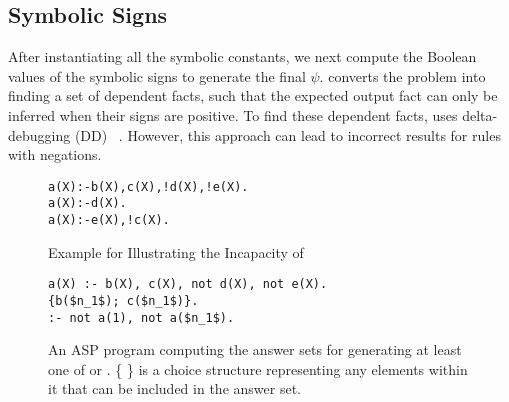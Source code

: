 \subsection{Symbolic Signs}

After instantiating all the symbolic constants, 
we next compute the Boolean values of the symbolic signs to generate the final $\psi$. 
\Symlog converts the problem 
into finding a set of dependent facts, such that the expected output fact can only be inferred when their signs are positive.
To find these dependent facts, \Symlog uses delta-debugging (DD) ~\cite{zeller1999yesterday}. 
However, this approach can lead to incorrect results for rules with negations.


\begin{figure}[!b]
\vspace{-4mm}
\begin{lstlisting}[xleftmargin=7em,numbers=none,basicstyle=\footnotesize\ttfamily]
a(X):-b(X),c(X),!d(X),!e(X).
a(X):-d(X).
a(X):-e(X),!c(X).
\end{lstlisting} 
\caption{Example for Illustrating the Incapacity of \Symlog}
\label{fig:symbolic_sign_Example}
\vspace{-1mm}
\end{figure}

\begin{figure}[!b]
\begin{lstlisting}[mathescape, xleftmargin=4em,numbers=none,basicstyle=\footnotesize\ttfamily]
a(X) :- b(X), c(X), not d(X), not e(X).
{b($n_1$); c($n_1$)}.
:- not a(1), not a($n_1$).
\end{lstlisting}
\caption{An ASP program computing the answer sets for generating at least one of  or .
\{ \} is a choice structure representing any elements within it that can be included in the answer set. 
\label{fig:asp_program}
}
%
\end{figure}


